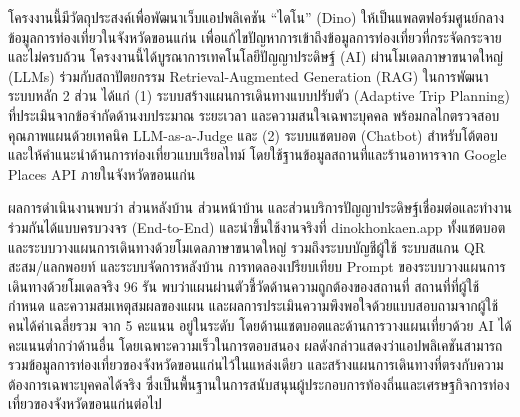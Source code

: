 
โครงงานนี้มีวัตถุประสงค์เพื่อพัฒนาเว็บแอปพลิเคชัน ``ไดโน'' (Dino) ให้เป็นแพลตฟอร์มศูนย์กลางข้อมูลการท่องเที่ยวในจังหวัดขอนแก่น เพื่อแก้ไขปัญหาการเข้าถึงข้อมูลการท่องเที่ยวที่กระจัดกระจายและไม่ครบถ้วน โครงงานนี้ได้บูรณาการเทคโนโลยีปัญญาประดิษฐ์ (AI) ผ่านโมเดลภาษาขนาดใหญ่ (LLMs) ร่วมกับสถาปัตยกรรม Retrieval-Augmented Generation (RAG) ในการพัฒนาระบบหลัก 2 ส่วน ได้แก่ (1) ระบบสร้างแผนการเดินทางแบบปรับตัว (Adaptive Trip Planning) ที่ประเมินจากข้อจำกัดด้านงบประมาณ ระยะเวลา และความสนใจเฉพาะบุคคล พร้อมกลไกตรวจสอบคุณภาพแผนด้วยเทคนิค LLM-as-a-Judge และ (2) ระบบแชตบอต (Chatbot) สำหรับโต้ตอบและให้คำแนะนำด้านการท่องเที่ยวแบบเรียลไทม์ โดยใช้ฐานข้อมูลสถานที่และร้านอาหารจาก Google Places API ภายในจังหวัดขอนแก่น

ผลการดำเนินงานพบว่า ส่วนหลังบ้าน ส่วนหน้าบ้าน และส่วนบริการปัญญาประดิษฐ์เชื่อมต่อและทำงานร่วมกันได้แบบครบวงจร (End-to-End) และนำขึ้นใช้งานจริงที่ dinokhonkaen.app ทั้งแชตบอตและระบบวางแผนการเดินทางด้วยโมเดลภาษาขนาดใหญ่ รวมถึงระบบบัญชีผู้ใช้ ระบบสแกน QR สะสม/แลกพอยท์ และระบบจัดการหลังบ้าน การทดลองเปรียบเทียบ Prompt ของระบบวางแผนการเดินทางด้วยโมเดลจริง 96 รัน พบว่าแผนผ่านตัวชี้วัดด้านความถูกต้องของสถานที่ สถานที่ที่ผู้ใช้กำหนด และความสมเหตุสมผลของแผน และผลการประเมินความพึงพอใจด้วยแบบสอบถามจากผู้ใช้ \surveyN{} คนได้ค่าเฉลี่ยรวม \surveyOverallMean{} จาก 5 คะแนน อยู่ในระดับ\surveyOverallLevel{} โดยด้านแชตบอตและด้านการวางแผนเที่ยวด้วย AI ได้คะแนนต่ำกว่าด้านอื่น โดยเฉพาะความเร็วในการตอบสนอง ผลดังกล่าวแสดงว่าแอปพลิเคชันสามารถรวมข้อมูลการท่องเที่ยวของจังหวัดขอนแก่นไว้ในแหล่งเดียว และสร้างแผนการเดินทางที่ตรงกับความต้องการเฉพาะบุคคลได้จริง ซึ่งเป็นพื้นฐานในการสนับสนุนผู้ประกอบการท้องถิ่นและเศรษฐกิจการท่องเที่ยวของจังหวัดขอนแก่นต่อไป
